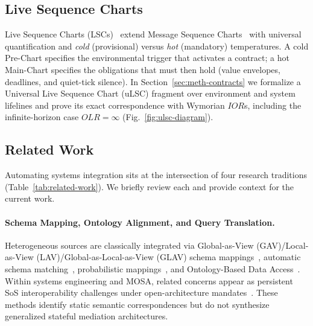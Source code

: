 \subsection{Live Sequence Charts} \label{sec:bg-ulsc}

Live Sequence Charts (LSCs)~\cite{DammHarel2001, HarelMarelly2003} extend Message Sequence Charts~\cite{ITUTZ120} with universal quantification and \emph{cold} (provisional) versus \emph{hot} (mandatory) temperatures.  A cold Pre-Chart specifies the environmental trigger that activates a contract; a hot Main-Chart specifies the obligations that must then hold (value envelopes, deadlines, and quiet-tick silence).  In Section~\ref{sec:meth-contracts} we formalize a Universal Live Sequence Chart (uLSC) fragment over environment and system lifelines and prove its exact correspondence with Wymorian $IOR$s, including the infinite-horizon case $OLR = \infty$ (Fig.~\ref{fig:ulsc-diagram}).

\subsection{Related Work} \label{sec:bg-literature}

Automating systems integration sits at the intersection of four research traditions (Table~\ref{tab:related-work}).  We briefly review each and provide context for the current work.

\paragraph{Schema Mapping, Ontology Alignment, and Query Translation.}
Heterogeneous sources are classically integrated via Global-as-View (GAV)/Local-as-View (LAV)/Global-as-Local-as-View (GLAV) schema mappings~\cite{lenzerini2002data}, automatic schema matching~\cite{rahm2001schema}, probabilistic mappings~\cite{dong2009data}, and Ontology-Based Data Access~\cite{calvanese2007tractable, xiao2018ontology}.  Within systems engineering and MOSA, related concerns appear as persistent SoS interoperability challenges under open-architecture mandates~\cite{madni2014system, esper2019modular, zimmerman2019considerations}.  These methods identify static semantic correspondences but do not synthesize generalized stateful mediation architectures.

